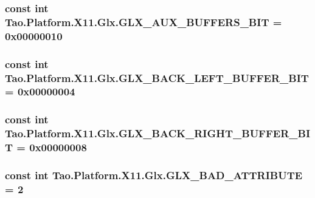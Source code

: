 \label{class_tao_1_1_platform_1_1_x11_1_1_glx_a0147fc8ab93b951f8d7f463bac372e0a}
\hypertarget{class_tao_1_1_platform_1_1_x11_1_1_glx_a05b8a5094b02f9360c52f2aec0437d2d}{
\subsubsection[{GLX\_\-AUX\_\-BUFFERS\_\-BIT}]{\setlength{\rightskip}{0pt plus 5cm}const int {\bf Tao.Platform.X11.Glx.GLX\_\-AUX\_\-BUFFERS\_\-BIT} = 0x00000010}}
\label{class_tao_1_1_platform_1_1_x11_1_1_glx_a05b8a5094b02f9360c52f2aec0437d2d}
\hypertarget{class_tao_1_1_platform_1_1_x11_1_1_glx_a40dba5844dd72194aed1435029abd44d}{
\subsubsection[{GLX\_\-BACK\_\-LEFT\_\-BUFFER\_\-BIT}]{\setlength{\rightskip}{0pt plus 5cm}const int {\bf Tao.Platform.X11.Glx.GLX\_\-BACK\_\-LEFT\_\-BUFFER\_\-BIT} = 0x00000004}}
\label{class_tao_1_1_platform_1_1_x11_1_1_glx_a40dba5844dd72194aed1435029abd44d}
\hypertarget{class_tao_1_1_platform_1_1_x11_1_1_glx_ae28309df04eee65baa036636d1e59459}{
\subsubsection[{GLX\_\-BACK\_\-RIGHT\_\-BUFFER\_\-BIT}]{\setlength{\rightskip}{0pt plus 5cm}const int {\bf Tao.Platform.X11.Glx.GLX\_\-BACK\_\-RIGHT\_\-BUFFER\_\-BIT} = 0x00000008}}
\label{class_tao_1_1_platform_1_1_x11_1_1_glx_ae28309df04eee65baa036636d1e59459}
\hypertarget{class_tao_1_1_platform_1_1_x11_1_1_glx_a514b1a15b854a85a00604567fe0cb57d}{
\subsubsection[{GLX\_\-BAD\_\-ATTRIBUTE}]{\setlength{\rightskip}{0pt plus 5cm}const int {\bf Tao.Platform.X11.Glx.GLX\_\-BAD\_\-ATTRIBUTE} = 2}}
